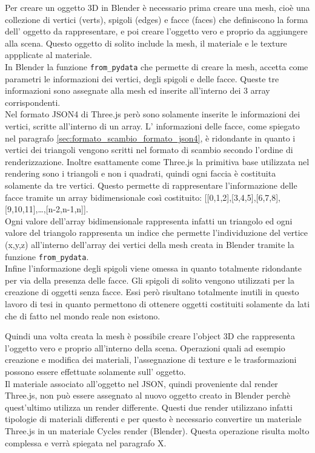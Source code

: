 Per creare un oggetto 3D in Blender è necessario prima creare una mesh, cioè una collezione di vertici (verts), spigoli (edges) e facce (faces) che definiscono la forma dell’ oggetto da rappresentare, e poi creare l’oggetto vero e proprio da aggiungere alla scena. Questo oggetto di solito include la mesh, il materiale e le texture appplicate al materiale.
\\
In Blender la funzione \texttt{from\_pydata} che permette di creare la mesh, accetta come parametri le informazioni dei vertici, degli spigoli e delle facce. Queste tre informazioni sono assegnate alla mesh ed inserite all’interno dei 3 array corrispondenti.
\\
Nel formato JSON4 di Three.js però sono solamente inserite le informazioni dei vertici, scritte all’interno di un array. L’ informazioni delle facce, come spiegato nel paragrafo \ref{sec:formato_scambio_formato_json4}, è ridondante in quanto i vertici dei triangoli vengono scritti nel formato di scambio secondo l’ordine di renderizzazione. Inoltre esattamente come Three.js la primitiva base utilizzata nel rendering sono i triangoli e non i quadrati, quindi ogni faccia è costituita solamente da tre vertici. 
Questo permette di rappresentare l’informazione delle facce tramite un array bidimensionale così costituito: [[0,1,2],[3,4,5],[6,7,8],[9,10,11],…,[n-2,n-1,n]].
\\
Ogni valore dell’array bidimensionale rappresenta infatti un triangolo ed ogni valore del triangolo rappresenta un indice che permette l’individuzione del vertice (x,y,z) all’interno dell’array dei vertici della mesh creata in Blender tramite la funzione \texttt{from\_pydata}.
\\
Infine l’informazione degli spigoli viene omessa in quanto totalmente ridondante per via della presenza delle facce. 
Gli spigoli di solito vengono utilizzati per la creazione di oggetti senza facce. Essi però risultano totalmente inutili in questo lavoro di tesi in quanto permettono di ottenere oggetti costituiti solamente da lati che di fatto nel mondo reale non esistono.



Quindi una volta creata la mesh è possibile creare l’object 3D che rappresenta l’oggetto vero e proprio all’interno della scena. Operazioni quali ad esempio creazione e modifica dei materiali, l’assegnazione di texture e le trasformazioni possono essere effettuate solamente sull’ oggetto.
\\
Il materiale associato all’oggetto nel JSON, quindi proveniente dal render Three.js, non può essere assegnato al nuovo oggetto creato in Blender perchè quest’ultimo utilizza un render differente. 
Questi due render utilizzano infatti tipologie di materiali differenti e per questo è necessario convertire un materiale Three.js in un materiale Cycles render (Blender). Questa operazione risulta molto complessa e verrà spiegata nel paragrafo X. 






